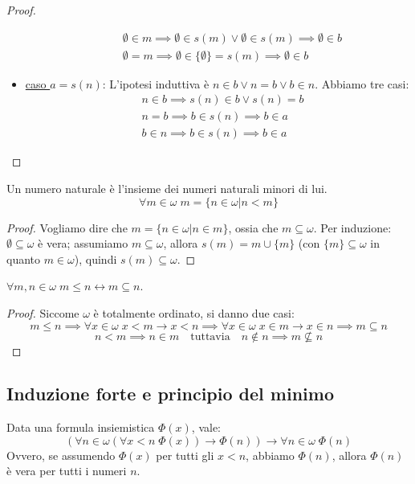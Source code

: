 \documentclass[11pt]{scrartcl}
\begin{document}
\begin{proof}
\begin{itemize}
\begin{itemize}
			\[ \begin{split}
				& \emptyset \in m \implies \emptyset \in s(m) \lor \emptyset \in s(m) \implies \emptyset \in b\\
				& \emptyset = m \implies \emptyset \in \{\emptyset\} = s(m) \implies \emptyset \in b
			\end{split}
				\]
		\end{itemize}
	\item \underline{caso $a = s(n)$}: L'ipotesi induttiva è $n \in b \lor n = b \lor b \in n$. Abbiamo tre casi:
		\[ \begin{split}
			& n \in b \implies s(n) \in b \lor s(n) = b \\
			& n = b \implies b \in s(n) \implies b \in a\\
			& b \in n \implies b \in s(n) \implies b \in a 
		\end{split}
			\]
	\end{itemize}
\end{proof}

\begin{corollary}
	Un numero naturale è l'insieme dei numeri naturali minori di lui.
	\[ \forall m \in \omega \; m = \{n \in \omega | n < m\}
		\]
\end{corollary}

\begin{proof}
	Vogliamo dire che $m = \{ n \in \omega | n \in m\}$, ossia che $m \subseteq \omega$. Per induzione: $\emptyset \subseteq \omega$ è vera;
	assumiamo $m \subseteq \omega$, allora $s(m) = m \cup \{m\}$ (con $\{m\} \subseteq \omega$ in quanto $m \in \omega$), quindi $s(m) \subseteq \omega$. %
\end{proof}

\begin{corollary}
	$\forall m,n \in \omega \; m \leq n \leftrightarrow m \subseteq n$.
\end{corollary}

\begin{proof}
	Siccome $\omega$ è totalmente ordinato, si danno due casi:
	\[ m \leq n \implies \forall x \in \omega \; x < m \rightarrow x < n \implies \forall x \in \omega \; x \in m \rightarrow x \in n \implies m \subseteq n
		\]\[ n < m \implies n \in m \quad \text{tuttavia} \quad n \not\in n \implies m \not\subseteq n
			\]
\end{proof}

\subsection{Induzione forte e principio del minimo}
\begin{theorem}
	Data una formula insiemistica $\Phi(x)$, vale:
	\[ (\forall n \in \omega (\forall x < n \; \Phi (x)) \rightarrow \Phi(n)) \rightarrow \forall n \in \omega \; \Phi(n)
		\]
	Ovvero, se assumendo $\Phi(x)$ per tutti gli $x < n$, abbiamo $\Phi(n)$, allora $\Phi(n)$ è vera per tutti i numeri $n$.
\end{theorem}
\end{document}
